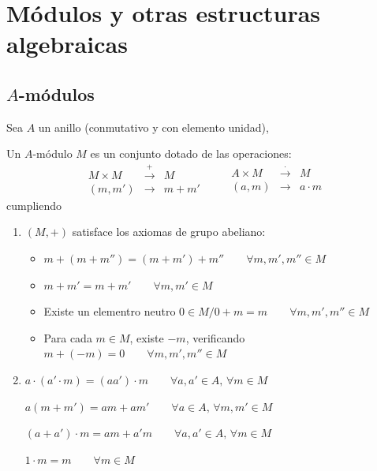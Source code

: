 \chapter{M\'odulos y otras estructuras algebraicas}
\justifying
\section{$A$-m\'odulos}

Sea $A$ un anillo (conmutativo y con elemento unidad),
\begin{defi}
    Un $A$-m\'odulo $M$ es un conjunto dotado de las operaciones:
    $$\begin{array}{rcl}
         M \times M & \overset{+}{\longrightarrow} & M \\
         (m,m') & \longrightarrow & m+m' 
    \end{array} \qquad \begin{array}{rcl}
         A \times M & \overset{\cdot}{\longrightarrow} & M \\
         (a,m) & \longrightarrow & a\cdot m 
    \end{array}$$
    cumpliendo  \vspace{-3mm}
    \begin{enumerate}
        \item $(M,+)$ satisface los axiomas de grupo abeliano:  \vspace{-3mm}
        \begin{itemize}
            \item $m+(m+m'')=(m+m')+m'' \qquad \forall m, m',m'' \in M$
            \item $m+m'=m+m' \qquad \forall m, m' \in M$
            \item Existe un elementro neutro $0\in M / 0+m=m \qquad \forall m, m',m'' \in M$
            \item Para cada $m\in M$, existe $-m$, verificando $m+(-m)=0 \qquad \forall m, m',m'' \in M$
        \end{itemize}
        \item $a\cdot (a' \cdot m) = (aa') \cdot m \qquad \forall a,a'\in A, \, \forall m \in M$

        $a (m + m') = am + am' \qquad \forall a\in A, \, \forall m, m' \in M$

        $(a+a') \cdot m = am+a'm \qquad \forall a,a'\in A, \, \forall m \in M$

        $1\cdot m = m \qquad \forall m \in M$
    \end{enumerate}
\end{defi}
